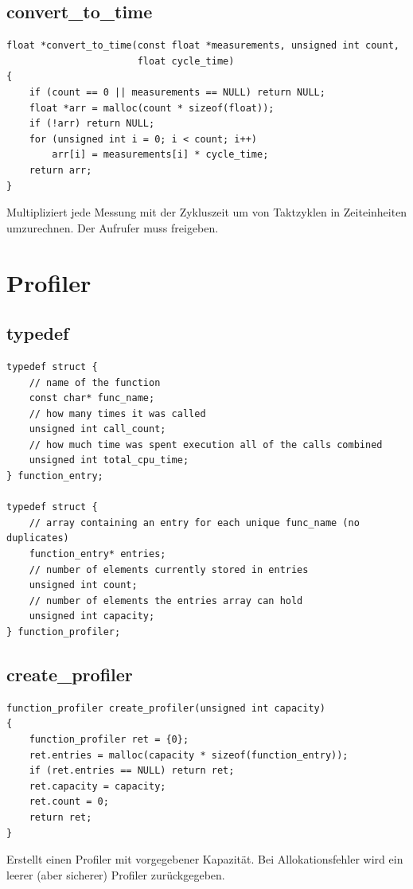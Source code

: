 \documentclass[10pt, a4paper]{article}
\begin{document}
\subsection{convert\_to\_time}
\begin{lstlisting}
float *convert_to_time(const float *measurements, unsigned int count,
                       float cycle_time)
{
    if (count == 0 || measurements == NULL) return NULL;
    float *arr = malloc(count * sizeof(float));
    if (!arr) return NULL;
    for (unsigned int i = 0; i < count; i++)
        arr[i] = measurements[i] * cycle_time;
    return arr;
}
\end{lstlisting}
Multipliziert jede Messung mit der Zykluszeit um von Taktzyklen in Zeiteinheiten umzurechnen. Der Aufrufer muss freigeben.

\newpage
\section{Profiler}

\subsection{typedef}
\begin{lstlisting}
typedef struct {
    // name of the function
    const char* func_name;
    // how many times it was called
    unsigned int call_count;
    // how much time was spent execution all of the calls combined
    unsigned int total_cpu_time;
} function_entry;

typedef struct {
    // array containing an entry for each unique func_name (no duplicates)
    function_entry* entries;
    // number of elements currently stored in entries
    unsigned int count;
    // number of elements the entries array can hold
    unsigned int capacity;
} function_profiler;
\end{lstlisting}

\subsection{create\_profiler}
\begin{lstlisting}
function_profiler create_profiler(unsigned int capacity)
{
    function_profiler ret = {0};
    ret.entries = malloc(capacity * sizeof(function_entry));
    if (ret.entries == NULL) return ret;
    ret.capacity = capacity;
    ret.count = 0;
    return ret;
}
\end{lstlisting}
Erstellt einen Profiler mit vorgegebener Kapazit\"at. Bei Allokationsfehler wird ein leerer (aber sicherer) Profiler zur\"uckgegeben.
\end{document}
